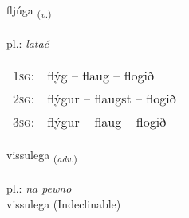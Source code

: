 \documentclass[frontgrid, backgrid]{flacards}\usepackage[]{graphicx}\usepackage[]{xcolor}
\begin{document}
\renewcommand{\flhead}{\vskip5pt \fboxsep=0pt {\small\bfseries\footnotesize Sagnorð | Verb}}
\renewcommand{\fcfoot}{\vskip5pt \fboxsep=0pt \hspace{2pt}{\small\bfseries\footnotesize 1K}}

\renewcommand{\blhead}{\vskip5pt {\small\bfseries\footnotesize Sagnorð | Verb }}
\renewcommand{\bcfoot}{\vskip5pt \hspace{2pt}{\small\bfseries\footnotesize 1K}}


{fljúga \small{\textsubscript{(\textit{v.})}} \\[1ex] %
\textphonetic{[fljuːɣa]} \\
pl.: \emph{latać} \\  [2ex]
\renewcommand*{\arraystretch}{0.8}
\begin{tabular}{p{1cm}l}
\textsc{1sg}: & flýg -- flaug -- flogið \\ 
\textsc{2sg}: & flýgur -- flaugst -- flogið \\ 
\textsc{3sg}: & flýgur -- flaug -- flogið \\ 
\end{tabular}
}


\renewcommand{\flhead}{\vskip5pt \fboxsep=0pt {\small\bfseries\footnotesize Atviksorð | Adverb}}
\renewcommand{\fcfoot}{\vskip5pt \fboxsep=0pt \hspace{2pt}{\small\bfseries\footnotesize 1K}}

\renewcommand{\blhead}{\vskip5pt {\small\bfseries\footnotesize Atviksorð | Adverb }}
\renewcommand{\bcfoot}{\vskip5pt \hspace{2pt}{\small\bfseries\footnotesize 1K}}


{vissulega \small{\textsubscript{(\textit{adv.})}} \\[1ex]
\textphonetic{[vɪsʏlɛɣa]} \\
pl.: \emph{na pewno} \\  [2ex]
vissulega (Indeclinable)}

\renewcommand{\flhead}{\vskip5pt \fboxsep=0pt {\small\bfseries\footnotesize Lýsingarorð | Adjective}}
\renewcommand{\fcfoot}{\vskip5pt \fboxsep=0pt \hspace{2pt}{\small\bfseries\footnotesize 1K}}
\end{document}
